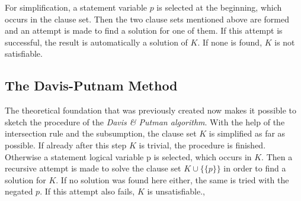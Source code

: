 For simplification, a statement variable $p$ is selected at the beginning, which occurs in the clause set. Then the two clause sets mentioned above are formed and an attempt is made to find a solution for one of them. If this attempt is successful, the result is automatically a solution of $K$. If none is found, $K$ is not satisfiable.

\subsection{The Davis-Putnam Method}
\label{sub:sciDavisPutnamMethod}
The theoretical foundation that was previously created now makes it possible to sketch the procedure of the \textit{Davis \& Putman algorithm}. With the help of the intersection rule and the subsumption, the clause set $K$ is simplified as far as possible. If already after this step $K$ is trivial, the procedure is finished. Otherwise a statement logical variable p is selected, which occurs in $K$. Then a recursive attempt is made to solve the clause set $K \cup \bigl\{\{p\}\bigr\}$ in order to find a solution for $K$. If no solution was found here either, the same is tried with the negated $p$. If this attempt also fails, $K$ is unsatisfiable.\cite{Zhang2000}, \cite{Stroetman2019}

